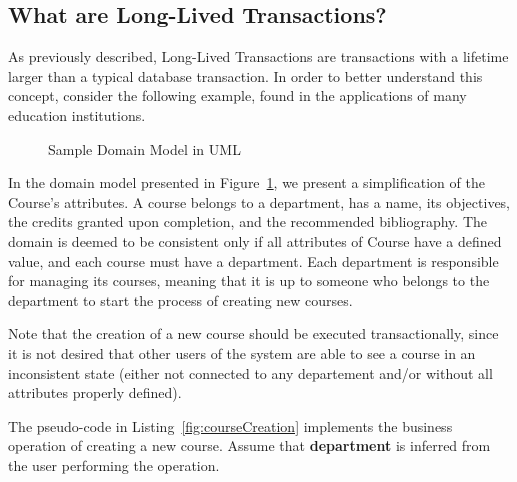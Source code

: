 \documentclass{llncs}
\begin{document}
\subsection{What are Long-Lived Transactions?}
\label{sec:what}

As previously described, Long-Lived Transactions are transactions with
a lifetime larger than a typical database transaction. In order to
better understand this concept, consider the following example, found
in the applications of many education institutions.

\begin{figure}
\centering
{}

\caption{Sample Domain Model in UML} 
\label{fig:courseDomain}

\end{figure}

In the domain model presented in Figure~\ref{fig:courseDomain}, we
present a simplification of the Course's attributes. A course belongs
to a department, has a name, its objectives, the credits granted upon
completion, and the recommended bibliography. The domain is deemed to
be consistent only if all attributes of Course have a defined value,
and each course must have a department. Each department is responsible
for managing its courses, meaning that it is up to someone who belongs
to the department to start the process of creating new courses.

Note that the creation of a new course should be executed
transactionally, since it is not desired that other users of the
system are able to see a course in an inconsistent state (either not
connected to any departement and/or without all attributes properly defined).

The pseudo-code in Listing~\ref{fig:courseCreation} implements the
business operation of creating a new course. Assume that {\bf
  department} is inferred from the user performing the operation. 
\end{document}
